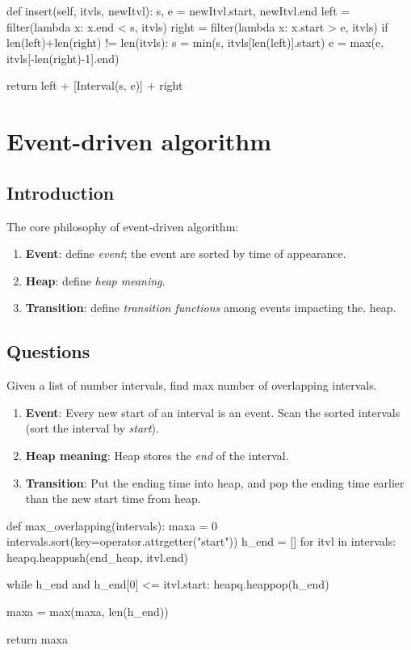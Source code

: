 \begin{python}
def insert(self, itvls, newItvl):
    s, e = newItvl.start, newItvl.end
    left = filter(lambda x: x.end < s, itvls)
    right = filter(lambda x: x.start > e, itvls)
    if len(left)+len(right) != len(itvls):
        s = min(s, itvls[len(left)].start)
        e = max(e, itvls[-len(right)-1].end)

    return left + [Interval(s, e)] + right

\end{python}

\section{Event-driven algorithm}
\subsection{Introduction}
The core philosophy of event-driven algorithm:
\begin{enumerate}
\item \textbf{Event}: define \textit{event}; the event are sorted by time of appearance.
\item \textbf{Heap}: define \textit{heap meaning}.
\item \textbf{Transition}: define \textit{transition functions} among events impacting the.
heap. 
\end{enumerate} 

\subsection{Questions}
 Given a list of number intervals, find max number of overlapping
intervals. 
\begin{enumerate}
\item \textbf{Event}: Every new start of an interval is an event. Scan the sorted intervals (sort the interval by \textit{start}).
\item \textbf{Heap meaning}: Heap stores the \textit{end} of the interval. 
\item \textbf{Transition}: Put the ending time into heap, and pop the ending time earlier than the new start time from heap.
\end{enumerate}
\newpage
\begin{python}
def max_overlapping(intervals):
    maxa = 0
    intervals.sort(key=operator.attrgetter("start"))
    h_end = []
    for itvl in intervals:
        heapq.heappush(end_heap, itvl.end)
        
        while h_end and h_end[0] <= itvl.start:
            heapq.heappop(h_end)

        maxa = max(maxa, len(h_end))

    return maxa
\end{python}

